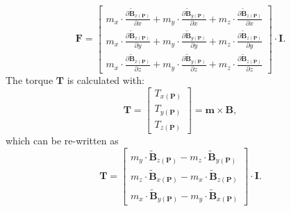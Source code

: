 \begin{equation}
\boldsymbol{F}=\begin{bmatrix}
m_x\cdot\frac{{\partial {\mathbf{\widetilde{B}}}_{x(\mathbf{P})}}}{\partial x}+m_y\cdot\frac{{\partial {\mathbf{\widetilde{B}}}_{y(\mathbf{P})}}}{\partial x}+m_z\cdot\frac{{\partial {\mathbf{\widetilde{B}}}_{z(\mathbf{P})}}}{\partial x}
\\ 
m_x\cdot\frac{{\partial {\mathbf{\widetilde{B}}}_{x(\mathbf{P})}}}{\partial y}+m_y\cdot\frac{{\partial {\mathbf{\widetilde{B}}}_{y(\mathbf{P})}}}{\partial y}+m_z\cdot\frac{{\partial {\mathbf{\widetilde{B}}}_{z(\mathbf{P})}}}{\partial y}
\\ 
m_x\cdot\frac{{\partial {\mathbf{\widetilde{B}}}_{x(\mathbf{P})}}}{\partial z}+m_y\cdot\frac{{\partial {\mathbf{\widetilde{B}}}_{y(\mathbf{P})}}}{\partial z}+m_z\cdot\frac{{\partial {\mathbf{\widetilde{B}}}_{z(\mathbf{P})}}}{\partial z}
\end{bmatrix}\cdot\mathbf{I}.
\end{equation}
%
The torque $\mathbf{T}$ is calculated with:
%
\begin{equation}
\mathbf{T}=\begin{bmatrix}
T_{x(\mathbf{P})}
\\ 
T_{y(\mathbf{P})}
\\ 
T_{z(\mathbf{P})}
\end{bmatrix}
=\mathbf{m}\times\mathbf{B},
\label{Torque}
\end{equation}
%
which can be re-written as
%
\begin{equation}
\mathbf{T}=\begin{bmatrix}
m_y\cdot \mathbf{\widetilde{B}}_{z(\mathbf{P})}-m_z\cdot \mathbf{\widetilde{B}}_{y(\mathbf{P})}
\\
m_z\cdot \mathbf{\widetilde{B}}_{x(\mathbf{P})}-m_x\cdot \mathbf{\widetilde{B}}_{z(\mathbf{P})}
\\ 
m_x\cdot \mathbf{\widetilde{B}}_{y(\mathbf{P})}-m_y\cdot \mathbf{\widetilde{B}}_{x(\mathbf{P})}
\end{bmatrix}\cdot \mathbf{I}.
\label{TorqueMatrix}
\end{equation}

